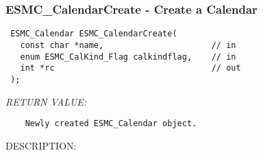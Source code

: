  
\setlength{\oldparskip}{\parskip}
\setlength{\parskip}{1.5ex}
\setlength{\oldparindent}{\parindent}
\setlength{\parindent}{0pt}
\setlength{\oldbaselineskip}{\baselineskip}
\setlength{\baselineskip}{11pt}
 
\def\bv{\begin{verbatim}}
\def\ev{\end{verbatim}}
\def\be{\begin{equation}}
\def\ee{\end{equation}}
\def\bea{\begin{eqnarray}}
\def\eea{\end{eqnarray}}
\def\bi{\begin{itemize}}
\def\ei{\end{itemize}}
\def\bn{\begin{enumerate}}
\def\en{\end{enumerate}}
\def\bd{\begin{description}}
\def\ed{\end{description}}
\def\({\left (}
\def\){\right )}
\def\[{\left [}
\def\]{\right ]}
\def\<{\left  \langle}
\def\>{\right \rangle}
\def\cI{{\cal I}}
\def\diag{\mathop{\rm diag}}
\def\tr{\mathop{\rm tr}}


 
\subsubsection [ESMC\_CalendarCreate] {ESMC\_CalendarCreate - Create a Calendar}


  
\begin{verbatim} ESMC_Calendar ESMC_CalendarCreate(
   const char *name,                      // in
   enum ESMC_CalKind_Flag calkindflag,    // in
   int *rc                                // out
 );
 \end{verbatim}{\em RETURN VALUE:}
\begin{verbatim}    Newly created ESMC_Calendar object.\end{verbatim}
{\sf DESCRIPTION:\\ }


